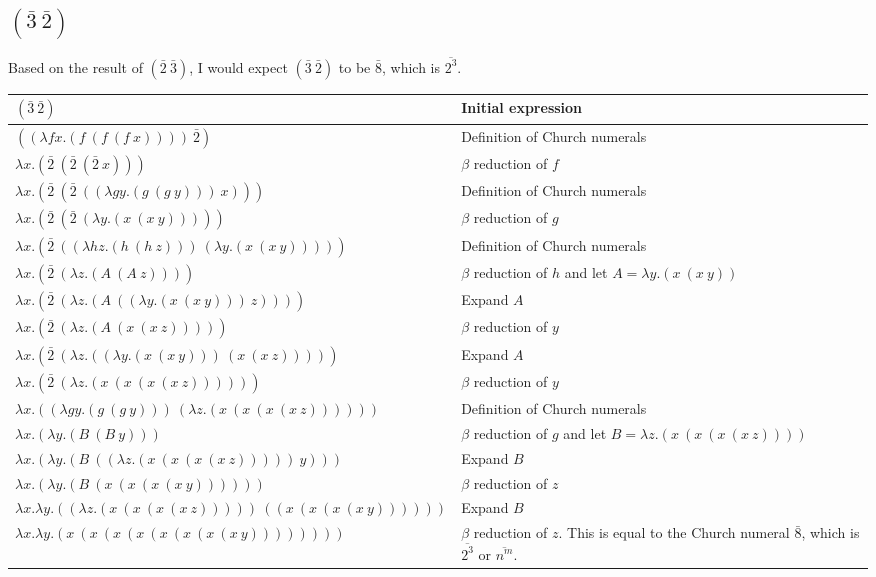 \documentclass[letterpaper, 10pt, DIV=13]{scrartcl}
\numberwithin{equation}{section}
\numberwithin{figure}{section}
\numberwithin{table}{section}
\begin{document}
\subsection{$(\bar{3}~\bar{2})$}
Based on the result of $(\bar{2}~\bar{3})$, I would expect $(\bar{3}~\bar{2})$ to be $\bar{8}$, which is $\overline{2^3}$.
\begin{center}
\begin{tabularx}{\textwidth}{|Y|Y|}
    \hline
    $(\bar{3}~\bar{2})$ & Initial expression \\
    \hline
    $((\lambda fx.(f~(f~(f~x))))~\bar{2})$ & Definition of Church numerals \\
    \hline
    $\lambda x.(\bar{2}~(\bar{2}~(\bar{2}~x)))$ & $\beta$ reduction of $f$ \\
    \hline
    $\lambda x.(\bar{2}~(\bar{2}~((\lambda gy.(g~(g~y)))~x)))$ & Definition of Church numerals \\
    \hline
    $\lambda x.(\bar{2}~(\bar{2}~(\lambda y.(x~(x~y)))))$ & $\beta$ reduction of $g$ \\
    \hline
    $\lambda x.(\bar{2}~((\lambda hz.(h~(h~z)))~(\lambda y.(x~(x~y)))))$ & Definition of Church numerals \\
    \hline
    $\lambda x.(\bar{2}~(\lambda z.(A~(A~z))))$ & $\beta$ reduction of $h$ and let $A = \lambda y.(x~(x~y))$ \\
    \hline
    $\lambda x.(\bar{2}~(\lambda z.(A~((\lambda y.(x~(x~y)))~z))))$ & Expand $A$ \\
    \hline
    $\lambda x.(\bar{2}~(\lambda z.(A~(x~(x~z)))))$ & $\beta$ reduction of $y$ \\
    \hline
    $\lambda x.(\bar{2}~(\lambda z.((\lambda y.(x~(x~y)))~(x~(x~z)))))$ & Expand $A$ \\
    \hline
    $\lambda x.(\bar{2}~(\lambda z.(x~(x~(x~(x~z))))))$ & $\beta$ reduction of $y$ \\
    \hline
    $\lambda x.((\lambda gy.(g~(g~y)))~(\lambda z.(x~(x~(x~(x~z))))))$ & Definition of Church numerals \\
    \hline
    $\lambda x.(\lambda y.(B~(B~y)))$ & $\beta$ reduction of $g$ and let $B = \lambda z.(x~(x~(x~(x~z))))$ \\
    \hline
    $\lambda x.(\lambda y.(B~((\lambda z.(x~(x~(x~(x~z)))))~y)))$ & Expand $B$ \\
    \hline
    $\lambda x.(\lambda y.(B~(x~(x~(x~(x~y))))))$ & $\beta$ reduction of $z$ \\
    \hline
    $\lambda x.\lambda y.((\lambda z.(x~(x~(x~(x~z)))))~((x~(x~(x~(x~y))))))$ & Expand $B$ \\
    \hline
    $\lambda x.\lambda y.(x~(x~(x~(x~(x~(x~(x~(x~y))))))))$ & $\beta$ reduction of $z$. This is equal to
    the Church numeral $\bar{8}$, which is $\overline{2^3}$ or $\overline{n^m}$. \\
    \hline
\end{tabularx}
\end{center}
\end{document}
